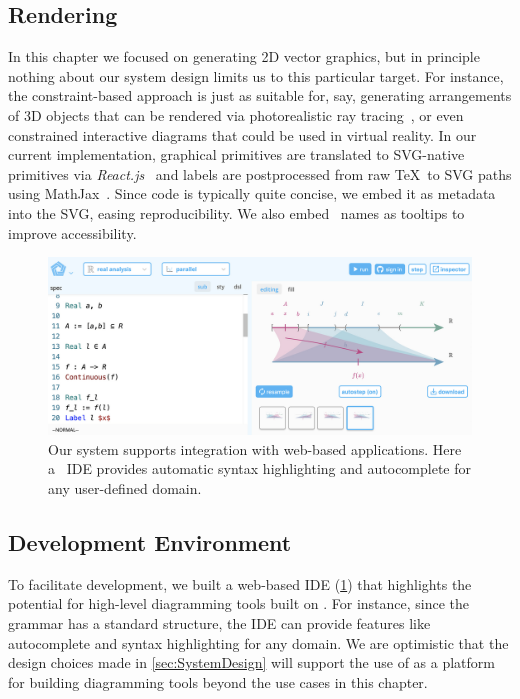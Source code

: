
\subsection{Rendering}
\label{sec:Rendering}

In this chapter we focused on generating 2D vector graphics, but in principle nothing about our system design limits us to this particular target.  For instance, the constraint-based approach is just as suitable for, say, generating arrangements of 3D objects that can be rendered via photorealistic ray tracing~\cite{Pharr:2016:PBR}, or even constrained interactive diagrams that could be used in virtual reality.  In our current implementation, graphical primitives are translated to SVG-native primitives via \emph{React.js}~\cite{Facebook:2020:RJS} and labels are postprocessed from raw \TeX\ to SVG paths using MathJax~\cite{Cervone:2012:MJ}.  Since \Penrose{} code is typically quite concise, we embed it as metadata into the SVG, easing reproducibility.  We also embed \Substance\ names as tooltips to improve accessibility.

\begin{figure}[t]
   \includegraphics[width=\columnwidth]{assets/penrose/PenroseIDE.jpg}
   \caption{Our system supports integration with web-based applications. Here a \Penrose\ IDE provides automatic syntax highlighting and autocomplete for any user-defined domain.\label{fig:PenroseIDE}}
\end{figure}

\subsection{Development Environment}
\label{sec:DevelopmentEnvironment}

To facilitate development, we built a web-based IDE (\cref{fig:PenroseIDE}) that highlights the potential for high-level diagramming tools built on \Penrose{}. For instance, since the \Domain{} grammar has a standard structure, the IDE can provide features like autocomplete and syntax highlighting for any domain. We are optimistic that the design choices made in \cref{sec:SystemDesign} will support the use of \Penrose{} as a platform for building diagramming tools beyond the use cases in this chapter.

